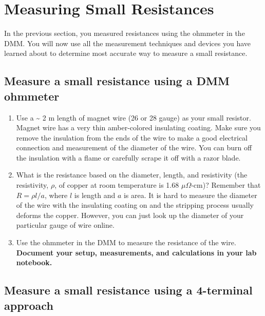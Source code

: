 \documentclass[10pt]{PhysLab1C} %
\begin{document}

\section{Measuring Small Resistances}

In the previous section, you measured resistances using the ohmmeter in
the DMM. You will now use all the measurement techniques and devices you have
learned about to determine most accurate way to measure a small
resistance.

\subsection{ Measure a small resistance using a DMM ohmmeter}

\begin{enumerate}
\def\labelenumi{\arabic{enumi}.}
\item
  Use a \textasciitilde{} 2 m length of magnet wire (26 or 28 gauge) as
  your small resistor. Magnet wire has a very thin amber-colored
  insulating coating. Make sure you remove the insulation from the ends
  of the wire to make a good electrical connection and measurement of
  the diameter of the wire. You can burn off the insulation with a flame
  or carefully scrape it off with a razor blade.
\item
  What is the resistance based on the diameter, length, and resistivity
  (the resistivity, \(\rho\), of copper at room temperature is 1.68
  $\mu\Omega$-cm)? Remember that \(R = \rho l/a\), where \(l\) is length and
  \(a\) is area. It is hard to measure the diameter of the wire with the
  insulating coating on and the stripping process usually deforms the
  copper. However, you can just look up the diameter of your particular
  gauge of wire online.
\item
  Use the ohmmeter in the DMM to measure the resistance of the wire.
  \textbf{Document your setup, measurements, and calculations in your
  lab notebook.}
\end{enumerate}

\subsection{Measure a small resistance using a 4-terminal approach}
\end{document}
